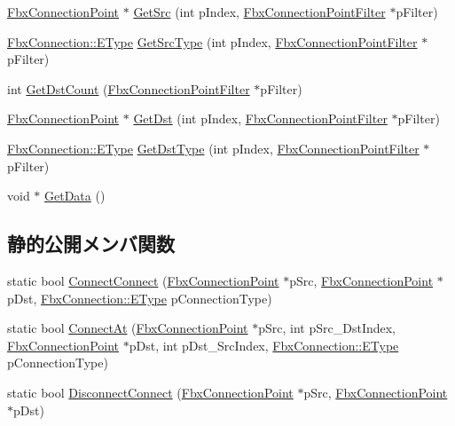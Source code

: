\begin{DoxyCompactItemize}
\hyperlink{class_fbx_connection_point}{Fbx\+Connection\+Point} $\ast$ \hyperlink{class_fbx_connection_point_a15464a4a8a8c1040df9389d9a46469f5}{Get\+Src} (int p\+Index, \hyperlink{class_fbx_connection_point_filter}{Fbx\+Connection\+Point\+Filter} $\ast$p\+Filter)
\item 
\hyperlink{class_fbx_connection_a3df448a5db356652ab99fd2be2553749}{Fbx\+Connection\+::\+E\+Type} \hyperlink{class_fbx_connection_point_a9eea3bf9fe36a61533e575b730ce7a47}{Get\+Src\+Type} (int p\+Index, \hyperlink{class_fbx_connection_point_filter}{Fbx\+Connection\+Point\+Filter} $\ast$p\+Filter)
\item 
int \hyperlink{class_fbx_connection_point_ae2dca593c5c5a527e10a98f25795ecc8}{Get\+Dst\+Count} (\hyperlink{class_fbx_connection_point_filter}{Fbx\+Connection\+Point\+Filter} $\ast$p\+Filter)
\item 
\hyperlink{class_fbx_connection_point}{Fbx\+Connection\+Point} $\ast$ \hyperlink{class_fbx_connection_point_a79fba15b4e575d9148c701ade1f6e998}{Get\+Dst} (int p\+Index, \hyperlink{class_fbx_connection_point_filter}{Fbx\+Connection\+Point\+Filter} $\ast$p\+Filter)
\item 
\hyperlink{class_fbx_connection_a3df448a5db356652ab99fd2be2553749}{Fbx\+Connection\+::\+E\+Type} \hyperlink{class_fbx_connection_point_a5319469d7eaadf57f569a91218620ba9}{Get\+Dst\+Type} (int p\+Index, \hyperlink{class_fbx_connection_point_filter}{Fbx\+Connection\+Point\+Filter} $\ast$p\+Filter)
\item 
void $\ast$ \hyperlink{class_fbx_connection_point_a52b3cc91f090580f9ae53d1da380b50a}{Get\+Data} ()
\end{DoxyCompactItemize}
\subsection*{静的公開メンバ関数}
\begin{DoxyCompactItemize}
\item 
static bool \hyperlink{class_fbx_connection_point_a31037bc6920c4391972e0293ff48d757}{Connect\+Connect} (\hyperlink{class_fbx_connection_point}{Fbx\+Connection\+Point} $\ast$p\+Src, \hyperlink{class_fbx_connection_point}{Fbx\+Connection\+Point} $\ast$p\+Dst, \hyperlink{class_fbx_connection_a3df448a5db356652ab99fd2be2553749}{Fbx\+Connection\+::\+E\+Type} p\+Connection\+Type)
\item 
static bool \hyperlink{class_fbx_connection_point_ac02d782e45f10a7b0961d24097e5dcbd}{Connect\+At} (\hyperlink{class_fbx_connection_point}{Fbx\+Connection\+Point} $\ast$p\+Src, int p\+Src\+\_\+\+Dst\+Index, \hyperlink{class_fbx_connection_point}{Fbx\+Connection\+Point} $\ast$p\+Dst, int p\+Dst\+\_\+\+Src\+Index, \hyperlink{class_fbx_connection_a3df448a5db356652ab99fd2be2553749}{Fbx\+Connection\+::\+E\+Type} p\+Connection\+Type)
\item 
static bool \hyperlink{class_fbx_connection_point_a6cc6b689ebbba86de7f144a2b1be5a9e}{Disconnect\+Connect} (\hyperlink{class_fbx_connection_point}{Fbx\+Connection\+Point} $\ast$p\+Src, \hyperlink{class_fbx_connection_point}{Fbx\+Connection\+Point} $\ast$p\+Dst)
\end{DoxyCompactItemize}
